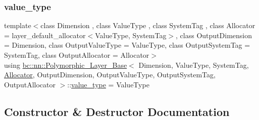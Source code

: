 \mbox{\label{structbc_1_1nn_1_1Polymorphic__Layer__Base_aa7d46845ee0a4544003a6f8fe3b7f52a}} 
\subsubsection{\texorpdfstring{value\+\_\+type}{value\_type}\hspace{0.1cm}{\footnotesize\ttfamily [2/2]}}
{\footnotesize\ttfamily template$<$class Dimension , class Value\+Type , class System\+Tag , class Allocator  = layer\+\_\+default\+\_\+allocator$<$\+Value\+Type, System\+Tag$>$, class Output\+Dimension  = Dimension, class Output\+Value\+Type  = Value\+Type, class Output\+System\+Tag  = System\+Tag, class Output\+Allocator  = Allocator$>$ \\
using \hyperlink{structbc_1_1nn_1_1Polymorphic__Layer__Base}{bc\+::nn\+::\+Polymorphic\+\_\+\+Layer\+\_\+\+Base}$<$ Dimension, Value\+Type, System\+Tag, \hyperlink{classbc_1_1allocators_1_1Allocator}{Allocator}, Output\+Dimension, Output\+Value\+Type, Output\+System\+Tag, Output\+Allocator $>$\+::\hyperlink{structbc_1_1nn_1_1Polymorphic__Layer__Base_aa7d46845ee0a4544003a6f8fe3b7f52a}{value\+\_\+type} =  Value\+Type}



\subsection{Constructor \& Destructor Documentation}
\mbox{\label{structbc_1_1nn_1_1Polymorphic__Layer__Base_a1b02e9a8e1b085c3b1eda984de21ce93}} 

